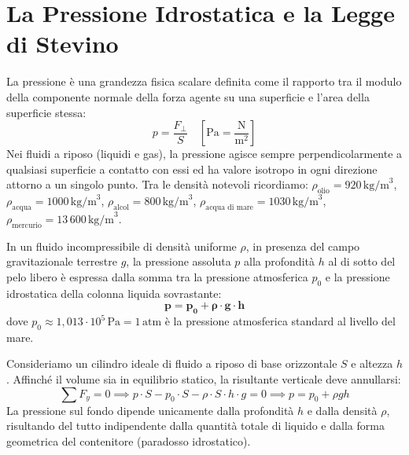 \documentclass[11pt,a4paper,oneside]{report}
\begin{document}
\section{La Pressione Idrostatica e la Legge di Stevino}

La pressione \`e una grandezza fisica scalare definita come il rapporto tra il modulo della componente normale della forza agente su una superficie e l'area della superficie stessa:
\[
p = \frac{F_\perp}{S} \quad \left[\text{Pa} = \frac{\text{N}}{\text{m}^2}\right]
\]
Nei fluidi a riposo (liquidi e gas), la pressione agisce sempre perpendicolarmente a qualsiasi superficie a contatto con essi ed ha valore isotropo in ogni direzione attorno a un singolo punto.
Tra le densit\`a notevoli ricordiamo:
$\rho_{\text{olio}} = 920\,\text{kg/m}^3$, $\rho_{\text{acqua}} = 1000\,\text{kg/m}^3$, $\rho_{\text{alcol}} = 800\,\text{kg/m}^3$, $\rho_{\text{acqua di mare}} = 1030\,\text{kg/m}^3$, $\rho_{\text{mercurio}} = 13\,600\,\text{kg/m}^3$.

\begin{leggefisica}
In un fluido incompressibile di densit\`a uniforme $\rho$, in presenza del campo gravitazionale terrestre $g$, la pressione assoluta $p$ alla profondit\`a $h$ al di sotto del pelo libero \`e espressa dalla somma tra la pressione atmosferica $p_0$ e la pressione idrostatica della colonna liquida sovrastante:
\[
\mathbf{p = p_0 + \rho \cdot g \cdot h}
\]
dove $p_0 \approx 1{,}013 \cdot 10^5\,\text{Pa} = 1\,\text{atm}$ \`e la pressione atmosferica standard al livello del mare.
\end{leggefisica}

\begin{commento}
Consideriamo un cilindro ideale di fluido a riposo di base orizzontale $S$ e altezza $h$. Affinch\'e il volume sia in equilibrio statico, la risultante verticale deve annullarsi:
\[
\sum F_y = 0 \implies p \cdot S - p_0 \cdot S - \rho \cdot S \cdot h \cdot g = 0 \implies p = p_0 + \rho g h
\]
La pressione sul fondo dipende unicamente dalla profondit\`a $h$ e dalla densit\`a $\rho$, risultando del tutto indipendente dalla quantit\`a totale di liquido e dalla forma geometrica del contenitore (paradosso idrostatico).
\end{commento}
\end{document}
